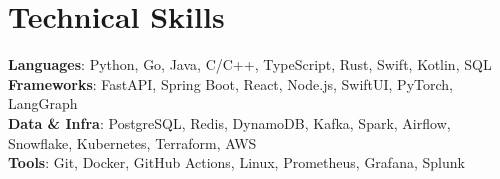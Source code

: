 \section{Technical Skills}
 \begin{itemize}[leftmargin=0.15in, label={}]
    \small{\item{
     \textbf{Languages}{: Python, Go, Java, C/C++, TypeScript, Rust, Swift, Kotlin, SQL} \\
     \textbf{Frameworks}{: FastAPI, Spring Boot, React, Node.js, SwiftUI, PyTorch, LangGraph} \\
     \textbf{Data \& Infra}{: PostgreSQL, Redis, DynamoDB, Kafka, Spark, Airflow, Snowflake, Kubernetes, Terraform, AWS} \\
     \textbf{Tools}{: Git, Docker, GitHub Actions, Linux, Prometheus, Grafana, Splunk}
    }}
 \end{itemize}
